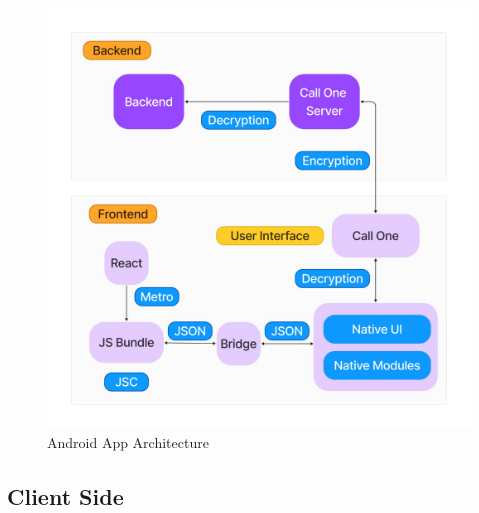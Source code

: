 \begin{figure}
    \centering
    \includegraphics[width=1\linewidth]{Media/arch.jpeg}
    \caption{Android App Architecture}
    \label{fig:React Native Architecture}
\end{figure}


\subsection{Client Side}


